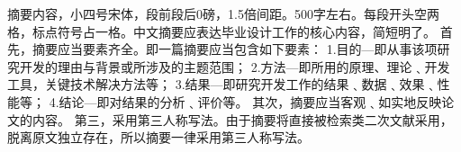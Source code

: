 \begin{abstractc}
摘要内容，小四号宋体，段前段后0磅，1.5倍间距。500字左右。每段开头空两格，标点符号占一格。中文摘要应表达毕业设计工作的核心内容，简短明了。
首先，摘要应当要素齐全。即一篇摘要应当包含如下要素：
1.目的—即从事该项研究开发的理由与背景或所涉及的主题范围；
2.方法—即所用的原理、理论﹑开发工具，关键技术解决方法等；
3.结果—即研究开发工作的结果﹑数据﹑效果﹑性能等；
4.结论—即对结果的分析﹑评价等。
其次，摘要应当客观﹑如实地反映论文的内容。
第三，采用第三人称写法。由于摘要将直接被检索类二次文献采用，脱离原文独立存在，所以摘要一律采用第三人称写法。

\end{abstractc}
